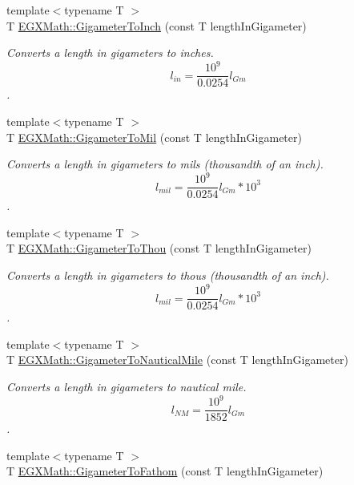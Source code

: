 \begin{DoxyCompactItemize}
{\footnotesize template$<$typename T $>$ }\\T \mbox{\hyperlink{group___e_g_x_math-_conversions-_length_conversions-_s_i-_gigameter-_imperial_gacff04b5343e94d6e31e601578d190fb8}{E\+G\+X\+Math\+::\+Gigameter\+To\+Inch}} (const T length\+In\+Gigameter)
\begin{DoxyCompactList}\small\item\em Converts a length in gigameters to inches. \[ l_{in}= \frac{10^{9}}{0.0254} l_{Gm} \]. \end{DoxyCompactList}\item 
{\footnotesize template$<$typename T $>$ }\\T \mbox{\hyperlink{group___e_g_x_math-_conversions-_length_conversions-_s_i-_gigameter-_imperial_ga498a43d44c0c0f6527362688d6cc361f}{E\+G\+X\+Math\+::\+Gigameter\+To\+Mil}} (const T length\+In\+Gigameter)
\begin{DoxyCompactList}\small\item\em Converts a length in gigameters to mils (thousandth of an inch). \[ l_{mil}= \frac{10^{9}}{0.0254} l_{Gm} * 10^{3} \]. \end{DoxyCompactList}\item 
{\footnotesize template$<$typename T $>$ }\\T \mbox{\hyperlink{group___e_g_x_math-_conversions-_length_conversions-_s_i-_gigameter-_imperial_ga94fd906264f882396dc438a684e22b41}{E\+G\+X\+Math\+::\+Gigameter\+To\+Thou}} (const T length\+In\+Gigameter)
\begin{DoxyCompactList}\small\item\em Converts a length in gigameters to thous (thousandth of an inch). \[ l_{mil}= \frac{10^{9}}{0.0254} l_{Gm} * 10^{3} \]. \end{DoxyCompactList}\item 
{\footnotesize template$<$typename T $>$ }\\T \mbox{\hyperlink{group___e_g_x_math-_conversions-_length_conversions-_s_i-_gigameter-_nautical_ga52d7a5290f284cdfec247ba606967867}{E\+G\+X\+Math\+::\+Gigameter\+To\+Nautical\+Mile}} (const T length\+In\+Gigameter)
\begin{DoxyCompactList}\small\item\em Converts a length in gigameters to nautical mile. \[ l_{NM}= \frac{10^{9}}{1852} l_{Gm} \]. \end{DoxyCompactList}\item 
{\footnotesize template$<$typename T $>$ }\\T \mbox{\hyperlink{group___e_g_x_math-_conversions-_length_conversions-_s_i-_gigameter-_nautical_gac09c5a61b554d3c3c2df3e414aca0e73}{E\+G\+X\+Math\+::\+Gigameter\+To\+Fathom}} (const T length\+In\+Gigameter)

\end{DoxyCompactItemize}
